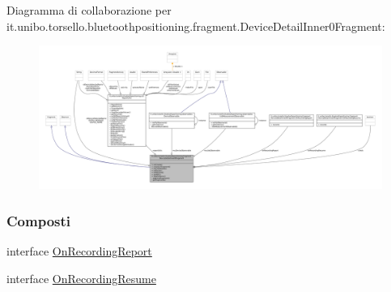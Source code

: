 Diagramma di collaborazione per it.\+unibo.\+torsello.\+bluetoothpositioning.\+fragment.\+Device\+Detail\+Inner0\+Fragment\+:
\nopagebreak
\begin{figure}[H]
\begin{center}
\leavevmode
\includegraphics[width=350pt]{classit_1_1unibo_1_1torsello_1_1bluetoothpositioning_1_1fragment_1_1DeviceDetailInner0Fragment__coll__graph}
\end{center}
\end{figure}
\subsubsection*{Composti}
\begin{DoxyCompactItemize}
\item 
interface \hyperlink{interfaceit_1_1unibo_1_1torsello_1_1bluetoothpositioning_1_1fragment_1_1DeviceDetailInner0Fragment_1_1OnRecordingReport}{On\+Recording\+Report}
\item 
interface \hyperlink{interfaceit_1_1unibo_1_1torsello_1_1bluetoothpositioning_1_1fragment_1_1DeviceDetailInner0Fragment_1_1OnRecordingResume}{On\+Recording\+Resume}
\end{DoxyCompactItemize}
